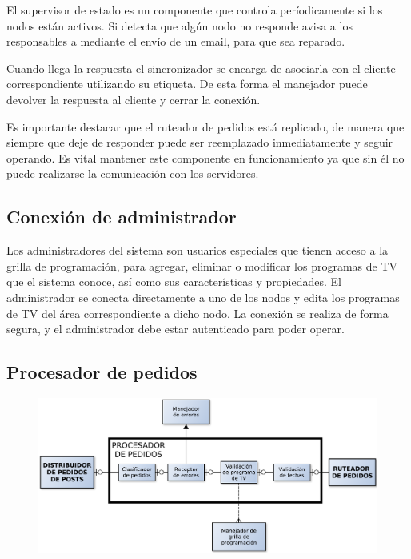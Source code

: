 El supervisor de estado es un componente que controla períodicamente si los nodos están activos. Si detecta que algún nodo no responde avisa a los responsables a mediante el envío de un email, para que sea reparado.

Cuando llega la respuesta el sincronizador se encarga de asociarla con el cliente correspondiente utilizando su etiqueta. De esta forma el manejador puede devolver la respuesta al cliente y cerrar la conexión.

Es importante destacar que el ruteador de pedidos está replicado, de manera que siempre que deje de responder puede ser reemplazado inmediatamente y seguir operando. Es vital mantener este componente en funcionamiento ya que sin él no puede realizarse la comunicación con los servidores.


\subsection{Conexión de administrador}

Los administradores del sistema son usuarios especiales que tienen acceso a la grilla de programación, para agregar, eliminar o modificar los programas de TV que el sistema conoce, así como sus características y propiedades. El administrador se conecta directamente a uno de los nodos y edita los programas de TV del área correspondiente a dicho nodo. La conexión se realiza de forma segura, y el administrador debe estar autenticado para poder operar.


\subsection{Procesador de pedidos}

\begin{figure}[H]
\centering
\includegraphics[width=\textwidth]{graph/procpedidos.pdf}
\end{figure}

